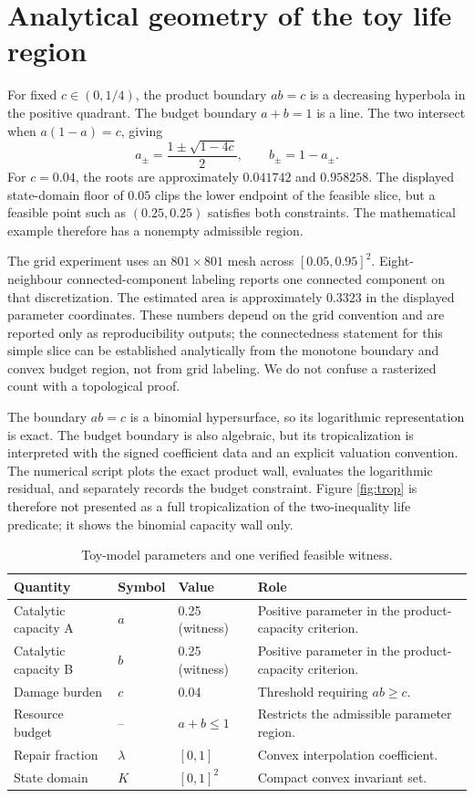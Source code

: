 \documentclass[11pt,a4paper]{article}
\theoremstyle{definition}
\theoremstyle{remark}
\begin{document}
\section{Analytical geometry of the toy life region}
For fixed \(c\in(0,1/4)\), the product boundary \(ab=c\) is a decreasing hyperbola in the positive quadrant. The budget boundary \(a+b=1\) is a line. The two intersect when \(a(1-a)=c\), giving
\[
a_\pm=\frac{1\pm\sqrt{1-4c}}{2},\qquad b_\pm=1-a_\pm.
\]
For \(c=0.04\), the roots are approximately \(0.041742\) and \(0.958258\). The displayed state-domain floor of \(0.05\) clips the lower endpoint of the feasible slice, but a feasible point such as \((0.25,0.25)\) satisfies both constraints. The mathematical example therefore has a nonempty admissible region.

The grid experiment uses an \(801\times801\) mesh across \([0.05,0.95]^2\). Eight-neighbour connected-component labeling reports one connected component on that discretization. The estimated area is approximately \(0.3323\) in the displayed parameter coordinates. These numbers depend on the grid convention and are reported only as reproducibility outputs; the connectedness statement for this simple slice can be established analytically from the monotone boundary and convex budget region, not from grid labeling. We do not confuse a rasterized count with a topological proof.

The boundary \(ab=c\) is a binomial hypersurface, so its logarithmic representation is exact. The budget boundary is also algebraic, but its tropicalization is interpreted with the signed coefficient data and an explicit valuation convention. The numerical script plots the exact product wall, evaluates the logarithmic residual, and separately records the budget constraint. Figure \ref{fig:trop} is therefore not presented as a full tropicalization of the two-inequality life predicate; it shows the binomial capacity wall only.

\begin{table}[H]
\centering\small
\caption{Toy-model parameters and one verified feasible witness.}
\begin{tabularx}{\textwidth}{@{}p{}p{}p{}X@{}}
\toprule
Quantity & Symbol & Value & Role \\
\midrule
Catalytic capacity A & \(a\) & 0.25 (witness) & Positive parameter in the product-capacity criterion.\\
Catalytic capacity B & \(b\) & 0.25 (witness) & Positive parameter in the product-capacity criterion.\\
Damage burden & \(c\) & 0.04 & Threshold requiring \(ab\geq c\).\\
Resource budget & -- & \(a+b\leq1\) & Restricts the admissible parameter region.\\
Repair fraction & \(\lambda\) & \([0,1]\) & Convex interpolation coefficient.\\
State domain & \(K\) & \([0,1]^2\) & Compact convex invariant set.\\
\bottomrule
\end{tabularx}
\end{table}
\end{document}
